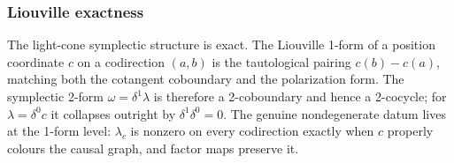 \subsubsection{Liouville exactness}

\begin{theorem}\label{thm:cotangent-symplectic-flow}\leanok{}
The light-cone symplectic structure is exact. The Liouville 1-form of a
position coordinate $c$ on a codirection $(a,b)$ is the tautological pairing
$c(b)-c(a)$, matching both the cotangent coboundary and the polarization form.
The symplectic 2-form $\omega=\delta^1\lambda$ is therefore a 2-coboundary and
hence a 2-cocycle; for $\lambda=\delta^0 c$ it collapses outright by
$\delta^1\delta^0=0$. The genuine nondegenerate datum lives at the 1-form
level: $\lambda_c$ is nonzero on every codirection exactly when $c$ properly
colours the causal graph, and factor maps preserve it.
\end{theorem}
